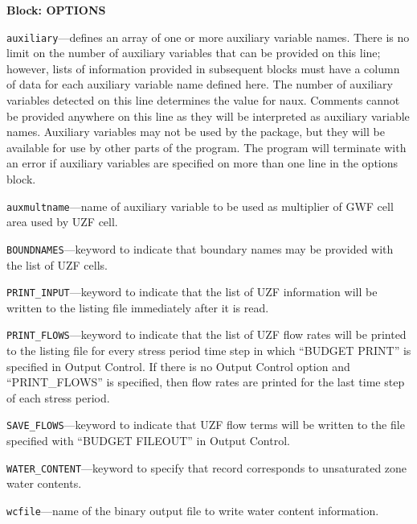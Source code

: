 
\item \textbf{Block: OPTIONS}

\begin{description}
\item \texttt{auxiliary}---defines an array of one or more auxiliary variable names.  There is no limit on the number of auxiliary variables that can be provided on this line; however, lists of information provided in subsequent blocks must have a column of data for each auxiliary variable name defined here.   The number of auxiliary variables detected on this line determines the value for naux.  Comments cannot be provided anywhere on this line as they will be interpreted as auxiliary variable names.  Auxiliary variables may not be used by the package, but they will be available for use by other parts of the program.  The program will terminate with an error if auxiliary variables are specified on more than one line in the options block.

\item \texttt{auxmultname}---name of auxiliary variable to be used as multiplier of GWF cell area used by UZF cell.

\item \texttt{BOUNDNAMES}---keyword to indicate that boundary names may be provided with the list of UZF cells.

\item \texttt{PRINT\_INPUT}---keyword to indicate that the list of UZF information will be written to the listing file immediately after it is read.

\item \texttt{PRINT\_FLOWS}---keyword to indicate that the list of UZF flow rates will be printed to the listing file for every stress period time step in which ``BUDGET PRINT'' is specified in Output Control.  If there is no Output Control option and ``PRINT\_FLOWS'' is specified, then flow rates are printed for the last time step of each stress period.

\item \texttt{SAVE\_FLOWS}---keyword to indicate that UZF flow terms will be written to the file specified with ``BUDGET FILEOUT'' in Output Control.

\item \texttt{WATER\_CONTENT}---keyword to specify that record corresponds to unsaturated zone water contents.

\item \texttt{wcfile}---name of the binary output file to write water content information.


\end{description}
